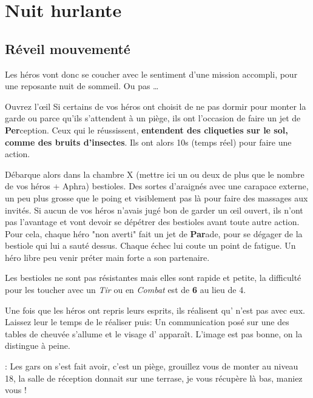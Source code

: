 \section{Nuit hurlante}

\subsection{Réveil mouvementé}

Les héros vont donc se coucher avec le sentiment d’une mission accompli, pour une reposante nuit de sommeil. Ou pas \dots

\begin{paperbox}{Ouvrez l’œil}
Si certains de vos héros ont choisit de ne pas dormir pour monter la garde ou parce qu’ils s’attendent à un piège, ils ont l’occasion de faire un jet de \textbf{Per}ception. Ceux qui le réussissent, \textbf{entendent des cliqueties sur le sol, comme des bruits d’insectes}. Ils ont alors 10s (temps réel) pour faire une action.
\end{paperbox}

Débarque alors dans la chambre X (mettre ici un ou deux de plus que le nombre de vos héros + Aphra) bestioles. Des sortes d’araignés avec une carapace externe, un peu plus grosse que le poing et visiblement pas là pour faire des massages aux invités. Si aucun de vos héros n’avais jugé bon de garder un œil ouvert, ils n’ont pas l’avantage et vont devoir se dépétrer des bestioles avant toute autre action. Pour cela, chaque héro "non averti" fait un jet de \textbf{Par}ade, pour se dégager de la bestiole qui lui a sauté dessus. Chaque échec lui coute un point de fatigue. Un héro libre peu venir préter main forte a son partenaire.

Les bestioles ne sont pas résistantes mais elles sont rapide et petite, la difficulté pour les toucher avec un \textit{Tir} ou en \textit{Combat} est de \textbf{6} au lieu de 4.

Une fois que les héros ont repris leurs esprits, ils réalisent qu’ n’est pas avec eux. Laissez leur le temps de le réaliser puis: Un communication posé sur une des tables de cheuvée s’allume et le visage d’ apparaît. L’image est pas bonne, on la distingue à peine.

\begin{quotebox}
\noindent\textbf{}: Les gars on s’est fait avoir, c’est un piège, grouillez vous de monter au niveau 18, la salle de réception donnait sur une terrase, je vous récupère là bas, maniez vous !
\end{quotebox}

